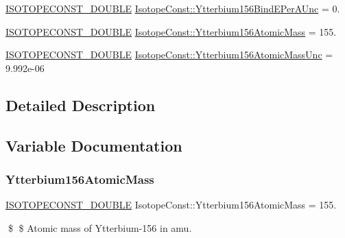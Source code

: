 \begin{DoxyCompactItemize}
\mbox{\hyperlink{group___isotope_const-_macros_ga8f45a7272ce02c0b4c65c44636ed719a}{I\+S\+O\+T\+O\+P\+E\+C\+O\+N\+S\+T\+\_\+\+D\+O\+U\+B\+LE}} \mbox{\hyperlink{group___isotope_const-_ytterbium-_yb156_ga4749a8f91ea37d23411ae5c5e813c375}{Isotope\+Const\+::\+Ytterbium156\+Bind\+E\+Per\+A\+Unc}} = 0.
\item 
\mbox{\hyperlink{group___isotope_const-_macros_ga8f45a7272ce02c0b4c65c44636ed719a}{I\+S\+O\+T\+O\+P\+E\+C\+O\+N\+S\+T\+\_\+\+D\+O\+U\+B\+LE}} \mbox{\hyperlink{group___isotope_const-_ytterbium-_yb156_ga290c902d3bbb3076c48b09bc035daade}{Isotope\+Const\+::\+Ytterbium156\+Atomic\+Mass}} = 155.
\item 
\mbox{\hyperlink{group___isotope_const-_macros_ga8f45a7272ce02c0b4c65c44636ed719a}{I\+S\+O\+T\+O\+P\+E\+C\+O\+N\+S\+T\+\_\+\+D\+O\+U\+B\+LE}} \mbox{\hyperlink{group___isotope_const-_ytterbium-_yb156_ga5556b22d662140d438a9a7976cd91696}{Isotope\+Const\+::\+Ytterbium156\+Atomic\+Mass\+Unc}} = 9.\+992e-\/06
\end{DoxyCompactItemize}


\subsection{Detailed Description}


\subsection{Variable Documentation}
\mbox{\label{group___isotope_const-_ytterbium-_yb156_ga290c902d3bbb3076c48b09bc035daade}} 
\subsubsection{\texorpdfstring{Ytterbium156\+Atomic\+Mass}{Ytterbium156AtomicMass}}
{\footnotesize\ttfamily \mbox{\hyperlink{group___isotope_const-_macros_ga8f45a7272ce02c0b4c65c44636ed719a}{I\+S\+O\+T\+O\+P\+E\+C\+O\+N\+S\+T\+\_\+\+D\+O\+U\+B\+LE}} Isotope\+Const\+::\+Ytterbium156\+Atomic\+Mass = 155.}

\$ \$ Atomic mass of Ytterbium-\/156 in amu. \mbox{\label{group___isotope_const-_ytterbium-_yb156_ga5556b22d662140d438a9a7976cd91696}} 
